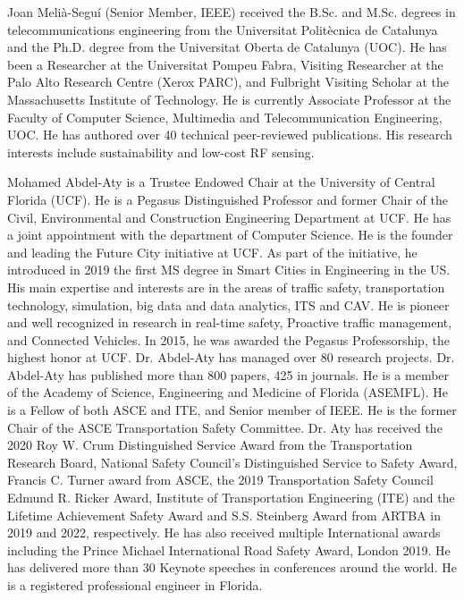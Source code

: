 \documentclass[lettersize,journal]{IEEEtran}
\begin{document}
\begin{IEEEbiography}{Joan Melià-Seguí} (Senior Member, IEEE) received the B.Sc. and M.Sc. degrees in telecommunications engineering from the Universitat Politècnica de Catalunya and the Ph.D. degree from the Universitat Oberta de Catalunya (UOC). He has been a Researcher at the Universitat Pompeu Fabra, Visiting Researcher at the Palo Alto Research Centre (Xerox PARC), and Fulbright Visiting Scholar at the Massachusetts Institute of Technology. He is currently Associate Professor at the Faculty of Computer Science, Multimedia and Telecommunication Engineering, UOC. He has authored over 40 technical peer-reviewed publications. His research interests include sustainability and low-cost RF sensing.
\end{IEEEbiography}

\vspace{11pt}

\begin{IEEEbiography}{Mohamed Abdel-Aty} is a Trustee Endowed Chair at the University of Central Florida (UCF). He is a Pegasus Distinguished Professor and former Chair of the Civil, Environmental and Construction Engineering Department at UCF. He has a joint appointment with the department of Computer Science. He is the founder and leading the Future City initiative at UCF. As part of the initiative, he introduced in 2019 the first MS degree in Smart Cities in Engineering in the US. His main expertise and interests are in the areas of traffic safety, transportation technology, simulation, big data and data analytics, ITS and CAV. He is pioneer and well recognized in research in real-time safety, Proactive traffic management, and Connected Vehicles. In 2015, he was awarded the Pegasus Professorship, the highest honor at UCF. Dr. Abdel-Aty has managed over 80 research projects. Dr. Abdel-Aty has published more than 800 papers, 425 in journals. He is a member of the Academy of Science, Engineering and Medicine of Florida (ASEMFL).  He is a Fellow of both ASCE and ITE, and Senior member of IEEE. He is the former Chair of the ASCE Transportation Safety Committee. Dr. Aty has received the 2020 Roy W. Crum Distinguished Service Award from the Transportation Research Board, National Safety Council’s Distinguished Service to Safety Award, Francis C. Turner award from ASCE, the 2019 Transportation Safety Council Edmund R. Ricker Award, Institute of Transportation Engineering (ITE) and the Lifetime Achievement Safety Award and S.S. Steinberg Award from ARTBA in 2019 and 2022, respectively. He has also received multiple International awards including the Prince Michael International Road Safety Award, London 2019. He has delivered more than 30 Keynote speeches in conferences around the world. He is a registered professional engineer in Florida.
\end{IEEEbiography}
\end{document}
